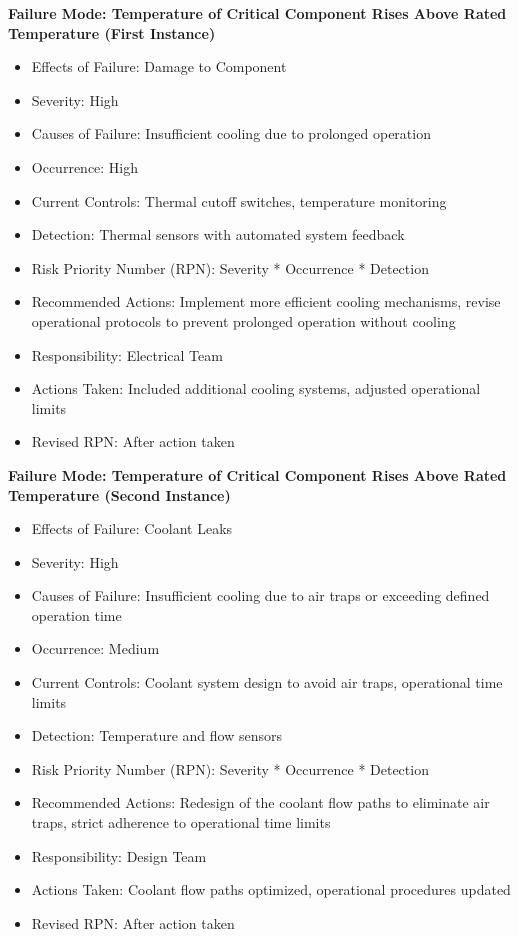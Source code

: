 \textbf{Failure Mode: Temperature of Critical Component Rises Above Rated Temperature (First Instance)}
\begin{itemize}
  \item Effects of Failure: Damage to Component
  \item Severity: High
  \item Causes of Failure: Insufficient cooling due to prolonged operation
  \item Occurrence: High
  \item Current Controls: Thermal cutoff switches, temperature monitoring
  \item Detection: Thermal sensors with automated system feedback
  \item Risk Priority Number (RPN): Severity * Occurrence * Detection
  \item Recommended Actions: Implement more efficient cooling mechanisms, revise operational protocols to prevent prolonged operation without cooling
  \item Responsibility: Electrical Team
  \item Actions Taken: Included additional cooling systems, adjusted operational limits
  \item Revised RPN: After action taken
\end{itemize}

\textbf{Failure Mode: Temperature of Critical Component Rises Above Rated Temperature (Second Instance)}
\begin{itemize}
  \item Effects of Failure: Coolant Leaks
  \item Severity: High
  \item Causes of Failure: Insufficient cooling due to air traps or exceeding defined operation time
  \item Occurrence: Medium
  \item Current Controls: Coolant system design to avoid air traps, operational time limits
  \item Detection: Temperature and flow sensors
  \item Risk Priority Number (RPN): Severity * Occurrence * Detection
  \item Recommended Actions: Redesign of the coolant flow paths to eliminate air traps, strict adherence to operational time limits
  \item Responsibility: Design Team
  \item Actions Taken: Coolant flow paths optimized, operational procedures updated
  \item Revised RPN: After action taken
\end{itemize}

